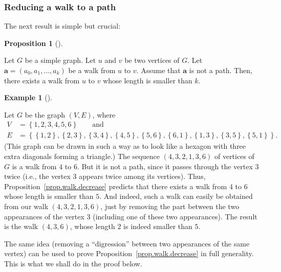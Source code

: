 \documentclass[numbers=enddot,12pt,final,onecolumn,notitlepage]{scrartcl}%
\theoremstyle{definition}
\newtheorem{prop}[theo]{Proposition}
\newenvironment{proposition}[1][]
{\begin{prop}[#1]\begin{leftbar}}
{\end{leftbar}\end{prop}}
\newtheorem{exam}[theo]{Example}
\newenvironment{example}[1][]
{\begin{exam}[#1]\begin{leftbar}}
{\end{leftbar}\end{exam}}
\newcommand{\set}[1]{\left\{ #1 \right\}}
\newcommand{\tup}[1]{\left( #1 \right)}
\begin{document}
\subsubsection{Reducing a walk to a path}

The next result is simple but crucial:

\begin{proposition} \label{prop.walk.decrease}
Let $G$ be a simple graph. Let $u$ and $v$ be two vertices of $G$.
Let $\mathbf{a} = \tup{a_0, a_1, \ldots, a_k}$ be a walk from $u$ to
$v$.
Assume that $\mathbf{a}$ is not a path. Then, there exists a walk
from $u$ to $v$ whose length is smaller than $k$.
\end{proposition}

\begin{example} \label{exa.walk.decrease}
Let $G$ be the graph $\tup{V, E}$, where
\begin{align*}
V &= \set{1, 2, 3, 4, 5, 6} \qquad \text{and} \\
E &= \set{\set{1,2}, \set{2,3}, \set{3,4}, \set{4,5}, \set{5,6},
          \set{6,1}, \set{1,3}, \set{3,5}, \set{5,1}} .
\end{align*}
(This graph can be drawn in such a way as to look like a hexagon with
three extra diagonals forming a triangle.)
The sequence $\tup{4, 3, 2, 1, 3, 6}$ of vertices of $G$ is a walk
from $4$ to $6$. But it is not a path, since it passes through
the vertex $3$ twice (i.e., the vertex $3$ appears twice among its
vertices). Thus, Proposition~\ref{prop.walk.decrease} predicts that
there exists a walk from $4$ to $6$ whose length is smaller than $5$.
And indeed, such a walk can easily be obtained from our walk
$\tup{4, 3, 2, 1, 3, 6}$, just by removing the part between the two
appearances of the vertex $3$ (including one of these two
appearances). The result is the walk $\tup{4, 3, 6}$, whose length
$2$ is indeed smaller than $5$.

The same idea (removing a ``digression'' between two appearances of
the same vertex) can be used to prove
Proposition~\ref{prop.walk.decrease} in full generality. This is what
we shall do in the proof below.
\end{example}
\end{document}
